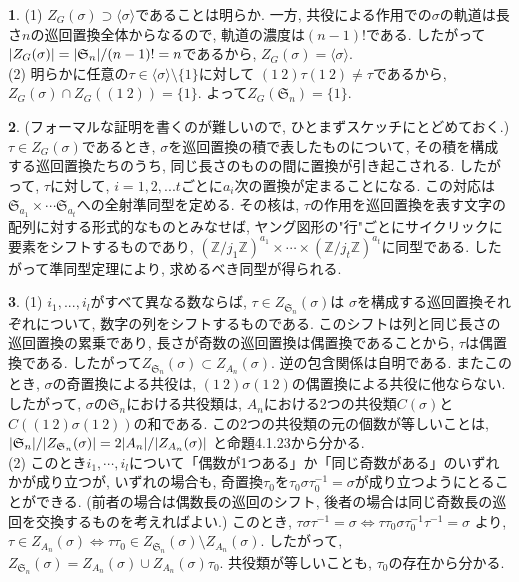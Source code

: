 \documentclass{amsart}
\theoremstyle{definition}
\newtheorem{ans}{}
\numberwithin{ans}{subsection}
\DeclarePairedDelimiter{\abs}{\lvert}{\rvert}
\begin{document}
\begin{ans}
  (1) $Z_G(\sigma) \supset \langle \sigma \rangle$であることは明らか.
  一方, 共役による作用での$\sigma$の軌道は長さ$n$の巡回置換全体からなるので, 軌道の濃度は$(n - 1)!$である.
  したがって$\abs{Z_G(\sigma)} = \abs{\mathfrak{S}_n}/(n - 1)! = n$であるから, $Z_G(\sigma) = \langle \sigma \rangle$.\\
  (2) 明らかに任意の$\tau \in \langle \sigma \rangle \setminus \{1\}$に対して
  $(1\ 2)\tau(1\ 2) \neq \tau$であるから, $Z_G(\sigma) \cap Z_G((1\ 2)) = \{1\}$.
  よって$Z_G(\mathfrak{S}_n) = \{1\}$.
\end{ans}

\begin{ans}
  (フォーマルな証明を書くのが難しいので, ひとまずスケッチにとどめておく.)
  $\tau \in Z_G(\sigma)$であるとき, $\sigma$を巡回置換の積で表したものについて,
  その積を構成する巡回置換たちのうち, 同じ長さのものの間に置換が引き起こされる.
  したがって, $\tau$に対して, $i = 1, 2,... t$ごとに$a_i$次の置換が定まることになる.
  この対応は$\mathfrak{S}_{a_1} \times \cdots \mathfrak{S}_{a_t}$への全射準同型を定める.
  その核は, $\tau$の作用を巡回置換を表す文字の配列に対する形式的なものとみなせば, ヤング図形の"行"ごとにサイクリックに要素をシフトするものであり,
  $(\mathbb{Z}/j_1\mathbb{Z})^{a_1} \times \cdots \times (\mathbb{Z}/j_t\mathbb{Z})^{a_t}$に同型である.
  したがって準同型定理により, 求めるべき同型が得られる.
\end{ans}

\begin{ans}
  (1) $i_1,..., i_l$がすべて異なる数ならば, $\tau \in Z_{\mathfrak{S}_n}(\sigma)$は
  $\sigma$を構成する巡回置換それぞれについて, 数字の列をシフトするものである.
  このシフトは列と同じ長さの巡回置換の累乗であり, 長さが奇数の巡回置換は偶置換であることから, $\tau$は偶置換である.
  したがって$Z_{\mathfrak{S}_n}(\sigma) \subset Z_{A_n}(\sigma)$. 逆の包含関係は自明である.
  またこのとき, $\sigma$の奇置換による共役は, $(1\ 2)\sigma(1\ 2)$の偶置換による共役に他ならない.
  したがって, $\sigma$の$\mathfrak{S}_n$における共役類は, $A_n$における2つの共役類$C(\sigma)$と$C((1\ 2)\sigma(1\ 2))$の和である.
  この2つの共役類の元の個数が等しいことは,
  $\abs{\mathfrak{S}_n}/\abs{Z_{\mathfrak{S}_n}(\sigma)} = 2\abs{A_n}/\abs{Z_{A_n}(\sigma)}$
  と命題4.1.23から分かる.\\
  (2) このとき$i_1,\cdots, i_l$について「偶数が1つある」か「同じ奇数がある」のいずれかが成り立つが,
  いずれの場合も, 奇置換$\tau_0$を$\tau_0\sigma\tau_0^{-1} = \sigma$が成り立つようにとることができる.
  (前者の場合は偶数長の巡回のシフト, 後者の場合は同じ奇数長の巡回を交換するものを考えればよい.)
  このとき, $\tau\sigma\tau^{-1} = \sigma \Longleftrightarrow \tau\tau_0\sigma\tau_0^{-1}\tau^{-1} = \sigma$
  より, $\tau \in Z_{A_n}(\sigma) \Longleftrightarrow \tau\tau_0 \in Z_{\mathfrak{S}_n}(\sigma) \setminus Z_{A_n}(\sigma)$.
  したがって, $Z_{\mathfrak{S}_n}(\sigma) = Z_{A_n}(\sigma) \cup Z_{A_n}(\sigma)\tau_0$.
  共役類が等しいことも, $\tau_0$の存在から分かる.
\end{ans}
\end{document}
